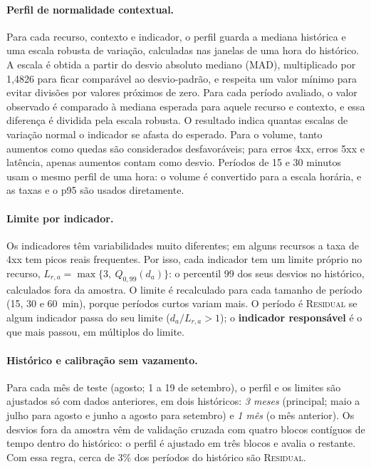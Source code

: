 \documentclass[sigconf,nonacm]{acmart}
\newcommand{\Residual}{\textsc{Residual}\xspace}
\begin{document}
\paragraph{Perfil de normalidade contextual.} Para cada recurso, contexto e indicador, o perfil guarda a mediana histórica e uma escala robusta de variação, calculadas nas janelas de uma hora do histórico. A escala é obtida a partir do desvio absoluto mediano (MAD), multiplicado por 1,4826 para ficar comparável ao desvio-padrão, e respeita um valor mínimo para evitar divisões por valores próximos de zero. Para cada período avaliado, o valor observado é comparado à mediana esperada para aquele recurso e contexto, e essa diferença é dividida pela escala robusta. O resultado indica quantas escalas de variação normal o indicador se afasta do esperado. Para o volume, tanto aumentos como quedas são considerados desfavoráveis; para erros 4xx, erros 5xx e latência, apenas aumentos contam como desvio. Períodos de 15 e 30 minutos usam o mesmo perfil de uma hora: o volume é convertido para a escala horária, e as taxas e o p95 são usados diretamente.

\paragraph{Limite por indicador.} Os indicadores têm variabilidades muito diferentes; em alguns recursos a taxa de 4xx tem picos reais frequentes. Por isso, cada indicador tem um limite próprio no recurso, $L_{r,a}=\max\{3,\ Q_{0{,}99}(d_a)\}$: o percentil 99 dos seus desvios no histórico, calculados fora da amostra. O limite é recalculado para cada tamanho de período (15, 30 e 60~min), porque períodos curtos variam mais. O período é \Residual se algum indicador passa do seu limite ($d_a/L_{r,a}>1$); o \textbf{indicador responsável} é o que mais passou, em múltiplos do limite.

\paragraph{Histórico e calibração sem vazamento.} Para cada mês de teste (agosto; 1 a 19 de setembro), o perfil e os limites são ajustados só com dados anteriores, em dois históricos: \emph{3 meses} (principal; maio a julho para agosto e junho a agosto para setembro) e \emph{1 mês} (o mês anterior). Os desvios fora da amostra vêm de validação cruzada com quatro blocos contíguos de tempo dentro do histórico: o perfil é ajustado em três blocos e avalia o restante. Com essa regra, cerca de 3\% dos períodos do histórico são \Residual.
\end{document}

